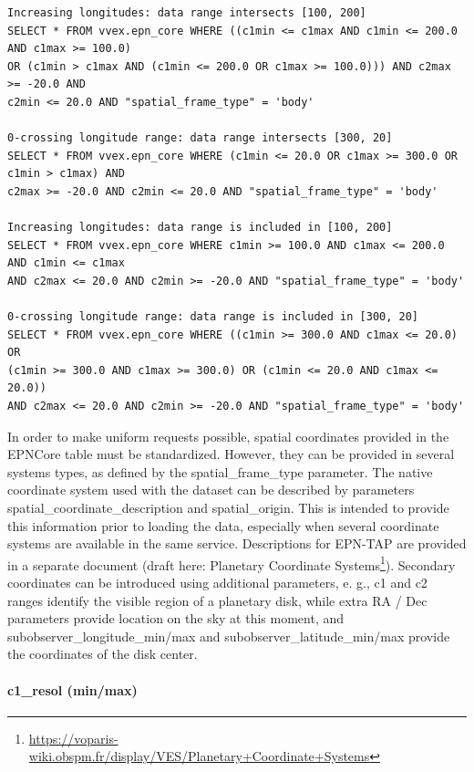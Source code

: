\documentclass[11pt,a4paper]{ivoa}
\begin{document}
\begin{verbatim}
Increasing longitudes: data range intersects [100, 200]
SELECT * FROM vvex.epn_core WHERE ((c1min <= c1max AND c1min <= 200.0 AND c1max >= 100.0) 
OR (c1min > c1max AND (c1min <= 200.0 OR c1max >= 100.0))) AND c2max >= -20.0 AND 
c2min <= 20.0 AND "spatial_frame_type" = 'body'

0-crossing longitude range: data range intersects [300, 20]
SELECT * FROM vvex.epn_core WHERE (c1min <= 20.0 OR c1max >= 300.0 OR c1min > c1max) AND 
c2max >= -20.0 AND c2min <= 20.0 AND "spatial_frame_type" = 'body'

Increasing longitudes: data range is included in [100, 200]
SELECT * FROM vvex.epn_core WHERE c1min >= 100.0 AND c1max <= 200.0 AND c1min <= c1max 
AND c2max <= 20.0 AND c2min >= -20.0 AND "spatial_frame_type" = 'body' 

0-crossing longitude range: data range is included in [300, 20]
SELECT * FROM vvex.epn_core WHERE ((c1min >= 300.0 AND c1max <= 20.0) OR 
(c1min >= 300.0 AND c1max >= 300.0) OR (c1min <= 20.0 AND c1max <= 20.0)) 
AND c2max <= 20.0 AND c2min >= -20.0 AND "spatial_frame_type" = 'body'

\end{verbatim}


In order to make uniform requests possible, spatial coordinates provided in the EPNCore table must be standardized. However, they can be provided in several systems types, as defined by the spatial\_frame\_type parameter. The native coordinate system used with the dataset can be described by parameters spatial\_coordinate\_description and spatial\_origin. This is intended to provide this information prior to loading the data, especially when several coordinate systems are available in the same service. Descriptions for EPN-TAP are provided in a separate document (draft here: Planetary Coordinate Systems\footnote{\url{https://voparis-wiki.obspm.fr/display/VES/Planetary+Coordinate+Systems}}). Secondary coordinates can be introduced using additional parameters, e. g., c1 and c2 ranges identify the visible region of a planetary disk, while extra RA / Dec parameters provide location on the sky at this moment, and subobserver\_longitude\_min/max and subobserver\_latitude\_min/max provide the coordinates of the disk center.

\paragraph{c1\_resol (min/max)}
\end{document}
